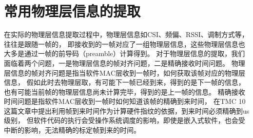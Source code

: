 	\section{常用物理层信息的提取}\label{sec:grtsec_phyinfo_substract}

	在实际的物理层信息提取过程中，物理层信息如CSI、频偏、RSSI、调制方式等，往往是跟随一帧的，
	即接收到的一帧对应了一组物理层信息，这些物理层信息也大多是通过一帧的前导码（preamble）计算得到。
	对于物理层信息的提取，我们面临着两个问题，一是物理层信息的帧对齐问题，二是精确接收时间问题。
	物理层信息的帧对齐问题是指当软件MAC层收到一帧时，如何获取该帧对应的物理层信息，
	假如此时去物理层取，有可能下一帧已经到来，得到的是下一帧的信息，也有可能当前帧的物理层信息尚未计算完毕，得到的是上一帧的信息。
	精确接收时间问题是指软件MAC层收到一帧时如何知道该帧的精确到来时间，
	在TMC 10\cite{tmc10clock}这篇文章中提出利用帧到来时间作为计算硬件指纹的依据，到来时间必须精确到us级别，
	但软件代码的执行会受操作系统调度的影响，即使是嵌入式软件，也会受中断的影响，无法精确的标定帧到来的时间。

